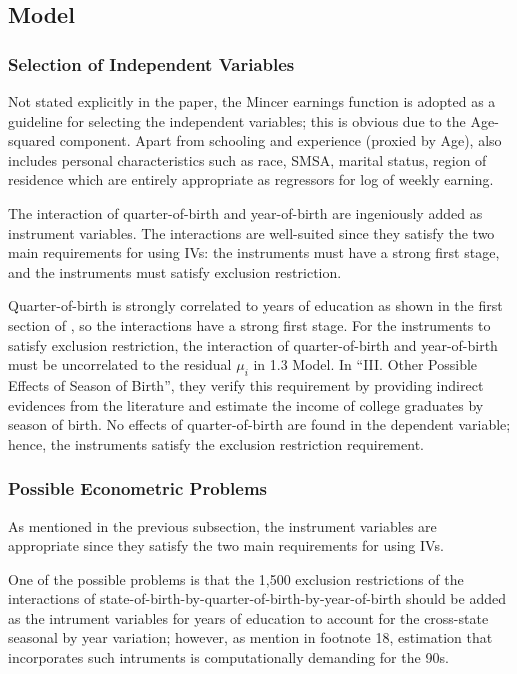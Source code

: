 \documentclass{article}
\begin{document}
\subsection{Model}

\subsubsection{Selection of Independent Variables}

Not stated explicitly in the paper, the Mincer earnings function is adopted as a guideline for selecting the independent variables; this is obvious due to the Age-squared component. Apart from schooling and experience (proxied by Age),  \cite{angrist1991} also includes personal characteristics such as  race, SMSA, marital status, region of residence which are entirely appropriate as regressors for log of weekly earning. 

The interaction of quarter-of-birth and year-of-birth are ingeniously added as instrument variables. The interactions are well-suited since they satisfy the two main requirements for using IVs: the instruments must have a strong first stage,  and the instruments must satisfy exclusion restriction.

Quarter-of-birth is strongly correlated to years of education as shown in the first section of \cite{angrist1991}, so the interactions have a strong first stage. For the instruments to satisfy 
exclusion restriction, the interaction of quarter-of-birth and year-of-birth must be uncorrelated to the residual $\mu _i$ in 1.3 Model. In ``III. Other  Possible Effects of Season of Birth'', they verify this requirement by providing indirect evidences from the literature and estimate the income of college graduates by season of birth. No effects of quarter-of-birth are found in the dependent variable; hence, 
the instruments satisfy the exclusion restriction requirement.

\subsubsection{Possible Econometric Problems}

As mentioned in the previous subsection, the instrument variables are appropriate since they satisfy the two main requirements for using IVs. 

One of the possible problems is that the 1,500 exclusion restrictions of the interactions of state-of-birth-by-quarter-of-birth-by-year-of-birth should be added as the intrument variables for years of education to account for the cross-state seasonal by year variation; however, as mention in footnote 18, estimation that incorporates such intruments is computationally demanding for the 90s.
\end{document}
